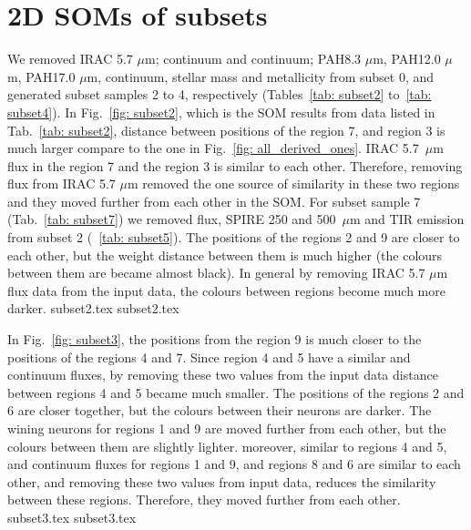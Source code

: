 \newpage
\appendix
\section{2D SOMs of subsets}
\label{sec: app_2d_soms_SOMN}

        We removed IRAC 5.7 $\mu$m; \sii continuum and \oiii continuum; PAH8.3 $\mu$m, PAH12.0 $\mu$m, PAH17.0 $\mu$m, \oiii continuum, stellar mass and metallicity from subset 0, and generated subset samples 2 to 4, respectively (Tables~\ref{tab: subset2} to~\ref{tab: subset4}).
        In Fig.~\ref{fig: subset2}, which is the SOM results from data listed in Tab.~\ref{tab: subset2}, distance between positions of the region 7, and region 3 is much larger compare to the one in Fig.~\ref{fig: all_derived_ones}. 
        IRAC 5.7~$\mu$m flux in the region 7 and the region 3 is similar to each other. 
        Therefore, removing flux from IRAC 5.7 $\mu$m removed the one source of similarity in these two regions and they moved further from each other in the SOM.
        For subset sample 7 (Tab.~\ref{tab: subset7}) we removed \sii flux, SPIRE 250 and 500~$\mu$m and TIR emission from subset 2 (~\ref{tab: subset5}).
        The positions of the regions 2 and 9 are closer to each other, but the weight distance between them is much higher (the colours between them are became almost black). 
        In general by removing IRAC 5.7 $\mu$m  flux data from the input data, the colours between regions become much more darker.
        {subset2.tex}
        {subset2.tex}
        
        In Fig.~\ref{fig: subset3}, the positions from the region 9 is much closer to the positions of the regions 4 and 7. 
        Since region 4 and 5 have a similar \oiii and \sii continuum fluxes, by removing these two values from the input data distance between regions 4 and 5 became much smaller.
        The positions of the regions 2 and 6 are closer together, but the colours between their neurons are darker.
        The wining neurons for regions 1 and 9 are moved further from each other, but the colours between them are slightly lighter. 
        moreover, similar to regions 4 and 5, \oiii and \sii continuum fluxes for regions 1 and 9, and regions 8 and 6 are similar to each other, and removing these two values from input data, reduces the similarity between these regions. Therefore, they moved further from each other. 
        {subset3.tex}
        {subset3.tex}
        
